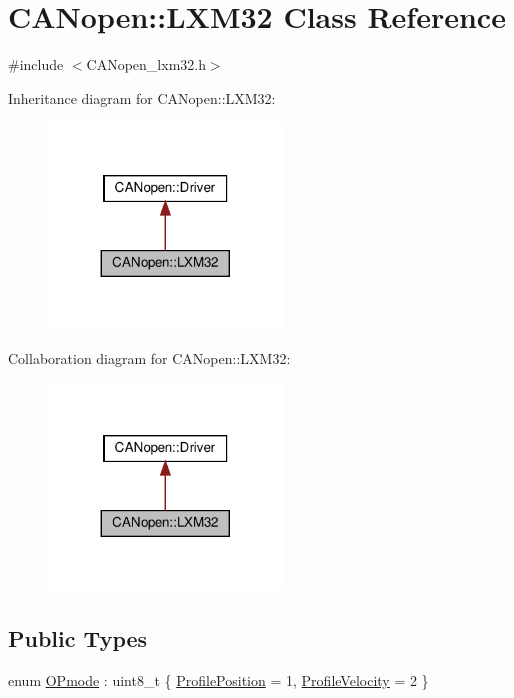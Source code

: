 \hypertarget{class_c_a_nopen_1_1_l_x_m32}{}\section{C\+A\+Nopen\+:\+:L\+X\+M32 Class Reference}
\label{class_c_a_nopen_1_1_l_x_m32}


{\ttfamily \#include $<$C\+A\+Nopen\+\_\+lxm32.\+h$>$}



Inheritance diagram for C\+A\+Nopen\+:\+:L\+X\+M32\+:\nopagebreak
\begin{figure}[H]
\begin{center}
\leavevmode
\includegraphics[width=176pt]{class_c_a_nopen_1_1_l_x_m32__inherit__graph}
\end{center}
\end{figure}


Collaboration diagram for C\+A\+Nopen\+:\+:L\+X\+M32\+:\nopagebreak
\begin{figure}[H]
\begin{center}
\leavevmode
\includegraphics[width=176pt]{class_c_a_nopen_1_1_l_x_m32__coll__graph}
\end{center}
\end{figure}
\subsection*{Public Types}
\begin{DoxyCompactItemize}
\item 
enum \hyperlink{class_c_a_nopen_1_1_l_x_m32_ac925b7d916f09f6b9ede53099ca7f136}{O\+Pmode} \+: uint8\+\_\+t \{ \hyperlink{class_c_a_nopen_1_1_l_x_m32_ac925b7d916f09f6b9ede53099ca7f136a5eb9a2719ae06e38895740e123321dbc}{Profile\+Position} = 1, 
\hyperlink{class_c_a_nopen_1_1_l_x_m32_ac925b7d916f09f6b9ede53099ca7f136a9bcb0eb48795ad942925719d59cdc1c9}{Profile\+Velocity} = 2
 \}
\end{DoxyCompactItemize}
